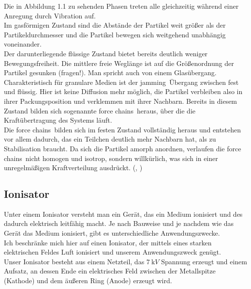 Die in Abbildung 1.1 zu sehenden Phasen treten alle gleichzeitig während einer Anregung durch Vibration auf. \\
Im gasförmigen Zustand sind die Abstände der Partikel weit größer als der Partikeldurchmesser und die Partikel bewegen sich weitgehend unabhängig voneinander. \\
Der darunterliegende flüssige Zustand bietet bereits deutlich weniger Bewegungsfreiheit. Die mittlere freie Weglänge ist auf die Größenordnung der Partikel gesunken (fragen!). Man spricht auch von einem Glasübergang. \\
Charakteristisch für granulare Medien ist der \glqq jamming\grqq \ Übergang zwischen fest und flüssig. Hier ist keine Diffusion mehr möglich, die Partikel verbleiben also in ihrer Packungsposition und verklemmen mit ihrer Nachbarn. Bereits in diesem Zustand bilden sich sogenannte \glqq force chains\grqq \ heraus, über die die Kraftübertragung des Systems läuft. \\
Die \glqq force chains\grqq \ bilden sich im festen Zustand vollständig heraus und entstehen vor allem dadurch, das ein Teilchen deutlich mehr Nachbarn hat, als zu Stabilisation braucht. Da sich die Partikel amorph anordnen, verlaufen die \glqq force chains\grqq \ nicht homogen und isotrop, sondern willkürlich, was sich in einer unregelmäßigen Kraftverteilung ausdrückt. (\cite{GranularJamming}, \cite{Fallturmexperiment})



\subsection{Ionisator}

Unter einem Ionisator versteht man ein Gerät, das ein Medium ionisiert und des dadurch elektrisch leitfähig macht. Je nach Bauweise und je nachdem wie das Gerät das Medium ionisiert, gibt es unterschiedliche Anwendungszwecke. \\
Ich beschränke mich hier auf einen Ionisator, der mittels eines starken elektrischen Feldes Luft ionisiert und unserem Anwendungszweck genügt. \\
Unser Ionisator besteht aus einem Netzteil, das $\SI{7}{\kilo V}$ Spannung erzeugt und einem Aufsatz, an dessen Ende ein elektrisches Feld zwischen der Metallspitze (Kathode) und dem äußeren Ring (Anode) erzeugt wird.



